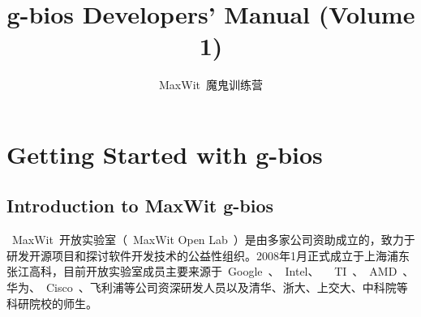 \documentclass[a4paper,11pt]{book}
\title{g-bios Developers' Manual (Volume 1)}
\author{MaxWit~魔鬼训练营}
\begin{document}
\maketitle

\frontmatter
\tableofcontents

\mainmatter
\chapter{Getting Started with g-bios}

\section{Introduction to MaxWit g-bios}
~MaxWit~开放实验室（~MaxWit Open Lab~）是由多家公司资助成立的，致力于研发开源项目和探讨软件开发技术的公益性组织。2008年1月正式成立于上海浦东张江高科，目前开放实验室成员主要来源于~Google~、~Intel、~ ~TI~、~AMD~、华为、~Cisco~、飞利浦等公司资深研发人员以及清华、浙大、上交大、中科院等科研院校的师生。
\end{document}
